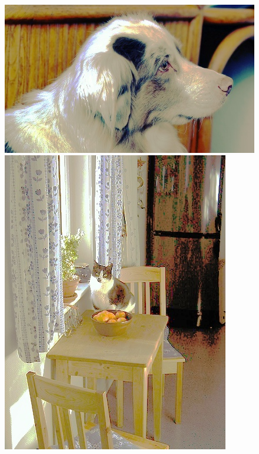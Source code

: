 \begin{appendices}
\begin{figure}[htb]
\begin{minipage}{0.19\textwidth}
\end{minipage}
\begin{minipage}{0.19\textwidth}
\includegraphics[width=\textwidth]{images/anomalien/HS/000454.jpg}
\end{minipage}
\begin{minipage}{0.19\textwidth}
\includegraphics[width=\textwidth]{images/anomalien/HS/000710.jpg}

\end{minipage}
\end{figure}
\end{appendices}
